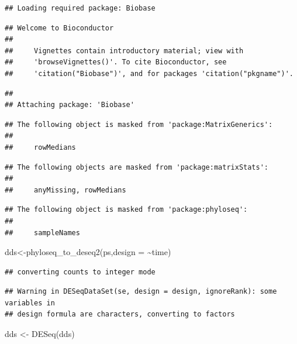 \documentclass[
]{book}
\newenvironment{Shaded}{\begin{snugshade}}{\end{snugshade}}
\newcommand{\AttributeTok}[1]{\textcolor[rgb]{0.77,0.63,0.00}{#1}}
\newcommand{\FunctionTok}[1]{\textcolor[rgb]{0.00,0.00,0.00}{#1}}
\newcommand{\NormalTok}[1]{#1}
\newcommand{\OtherTok}[1]{\textcolor[rgb]{0.56,0.35,0.01}{#1}}
\newcommand{\SpecialCharTok}[1]{\textcolor[rgb]{0.00,0.00,0.00}{#1}}
\begin{document}
\begin{verbatim}
## Loading required package: Biobase
\end{verbatim}

\begin{verbatim}
## Welcome to Bioconductor
## 
##     Vignettes contain introductory material; view with
##     'browseVignettes()'. To cite Bioconductor, see
##     'citation("Biobase")', and for packages 'citation("pkgname")'.
\end{verbatim}

\begin{verbatim}
## 
## Attaching package: 'Biobase'
\end{verbatim}

\begin{verbatim}
## The following object is masked from 'package:MatrixGenerics':
## 
##     rowMedians
\end{verbatim}

\begin{verbatim}
## The following objects are masked from 'package:matrixStats':
## 
##     anyMissing, rowMedians
\end{verbatim}

\begin{verbatim}
## The following object is masked from 'package:phyloseq':
## 
##     sampleNames
\end{verbatim}

\begin{Shaded}
\begin{Highlighting}[]
\NormalTok{dds}\OtherTok{\textless{}{-}}\FunctionTok{phyloseq\_to\_deseq2}\NormalTok{(ps,}\AttributeTok{design =} \SpecialCharTok{\textasciitilde{}}\NormalTok{time)}
\end{Highlighting}
\end{Shaded}

\begin{verbatim}
## converting counts to integer mode
\end{verbatim}

\begin{verbatim}
## Warning in DESeqDataSet(se, design = design, ignoreRank): some variables in
## design formula are characters, converting to factors
\end{verbatim}

\begin{Shaded}
\begin{Highlighting}[]
\NormalTok{dds }\OtherTok{\textless{}{-}} \FunctionTok{DESeq}\NormalTok{(dds)}
\end{Highlighting}
\end{Shaded}
\end{document}
